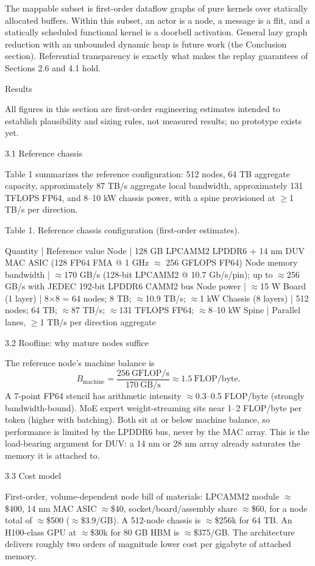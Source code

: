 \documentclass[10pt,twocolumn]{article}
\begin{document}
The mappable subset is first-order dataflow graphs of pure kernels over statically allocated buffers\cite{6,11}. Within this subset, an actor is a node, a message is a flit, and a statically scheduled functional kernel is a doorbell activation. General lazy graph reduction with an unbounded dynamic heap is future work (the Conclusion section). Referential transparency is exactly what makes the replay guarantees of Sections 2.6 and 4.1 hold.

Results

All figures in this section are first-order engineering estimates intended to establish plausibility and sizing rules, not measured results; no prototype exists yet.

3.1 Reference chassis

Table 1 summarizes the reference configuration: 512 nodes, 64 TB aggregate capacity, approximately 87 TB/s aggregate local bandwidth, approximately 131 TFLOPS FP64, and 8--10 kW chassis power, with a spine provisioned at $\geq$1 TB/s per direction.

Table 1. Reference chassis configuration (first-order estimates).

Quantity | Reference value
Node | 128 GB LPCAMM2 LPDDR6 + 14 nm DUV MAC ASIC (128 FP64 FMA @ 1 GHz $\approx$ 256 GFLOPS FP64)
Node memory bandwidth | $\approx$170 GB/s (128-bit LPCAMM2 @ 10.7 Gb/s/pin); up to $\approx$256 GB/s with JEDEC 192-bit LPDDR6 CAMM2 bus
Node power | $\approx$15 W
Board (1 layer) | 8$\times$8 = 64 nodes; 8 TB; $\approx$10.9 TB/s; $\approx$1 kW
Chassis (8 layers) | 512 nodes; 64 TB; $\approx$87 TB/s; $\approx$131 TFLOPS FP64; $\approx$8--10 kW
Spine | Parallel lanes, $\geq$1 TB/s per direction aggregate

3.2 Roofline: why mature nodes suffice

The reference node's machine balance is
$$
B_{\mathrm{machine}} = \frac{256\ \mathrm{GFLOP/s}}{170\ \mathrm{GB/s}} \approx 1.5\ \mathrm{FLOP/byte}.
$$
A 7-point FP64 stencil has arithmetic intensity $\approx$0.3--0.5 FLOP/byte (strongly bandwidth-bound). MoE expert weight-streaming sits near 1--2 FLOP/byte per token (higher with batching). Both sit at or below machine balance\cite{5}, so performance is limited by the LPDDR6 bus, never by the MAC array. This is the load-bearing argument for DUV: a 14 nm or 28 nm array already saturates the memory it is attached to.

3.3 Cost model

First-order, volume-dependent node bill of materials: LPCAMM2 module $\approx$\$400, 14 nm MAC ASIC $\approx$\$40, socket/board/assembly share $\approx$\$60, for a node total of $\approx$\$500 ($\approx$\$3.9/GB). A 512-node chassis is $\approx$\$256k for 64 TB. An H100-class GPU at $\approx$\$30k for 80 GB HBM is $\approx$\$375/GB\cite{2}. The architecture delivers roughly two orders of magnitude lower cost per gigabyte of attached memory.
\end{document}

